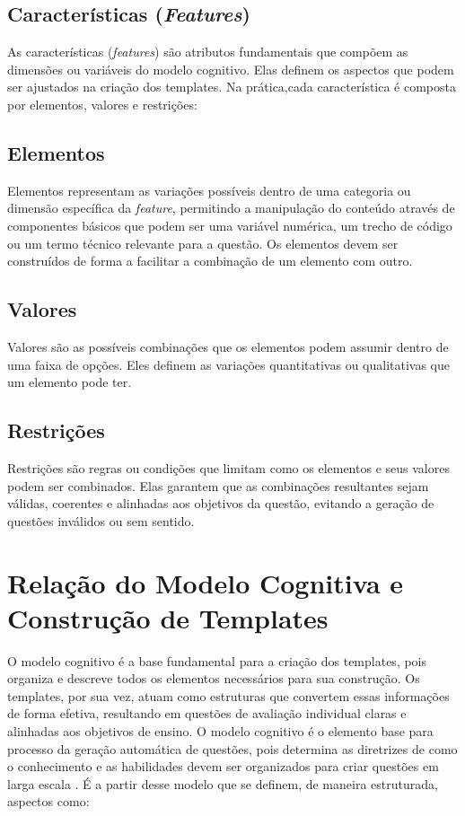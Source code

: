 \subsection{Características (\textit{Features})}



As características (\textit{features}) são atributos fundamentais que compõem as dimensões ou variáveis do modelo cognitivo. Elas definem os aspectos que podem ser ajustados na criação dos templates. Na prática,cada característica é composta por elementos, valores e restrições:


\subsection{Elementos}
Elementos representam as variações possíveis dentro de uma categoria ou dimensão específica da \textit{feature}, permitindo a manipulação do conteúdo através de componentes básicos que podem ser uma variável numérica, um trecho de código ou um termo técnico relevante para a questão. Os elementos devem ser construídos de forma a facilitar a combinação de um elemento com outro.

\subsection{Valores}
Valores são as possíveis combinações que os elementos podem assumir dentro de uma faixa de opções. Eles definem as variações quantitativas ou qualitativas que um elemento pode ter.

\subsection{Restrições}
Restrições são regras ou condições que limitam como os elementos e seus valores podem ser combinados. Elas garantem que as combinações resultantes sejam válidas, coerentes e alinhadas aos objetivos da questão, evitando a geração de questões inválidos ou sem sentido.

\section{Relação do Modelo Cognitiva e Construção de Templates }


O modelo cognitivo é a base fundamental para a criação dos templates, pois organiza e descreve todos os elementos necessários para sua construção. Os templates, por sua vez, atuam como estruturas que convertem essas informações de forma efetiva, resultando em questões de avaliação individual claras e alinhadas aos objetivos de ensino.
O modelo cognitivo é o elemento base para processo da geração automática de questões, pois determina as diretrizes de como o conhecimento e as habilidades devem ser organizados para criar questões em larga escala \cite{gierl2016, gierl2017, gierlbulutzhang2018, keehner2017}. É a partir desse modelo que se definem, de maneira estruturada, aspectos como:

